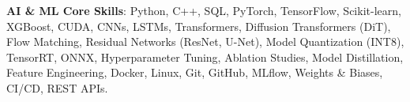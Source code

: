 \item \textbf{AI \& ML Core Skills}: Python, C++, SQL, PyTorch, TensorFlow, Scikit-learn, XGBoost, CUDA, CNNs, LSTMs, Transformers, Diffusion Transformers (DiT), Flow Matching, Residual Networks (ResNet, U-Net), Model Quantization (INT8), TensorRT, ONNX, Hyperparameter Tuning, Ablation Studies, Model Distillation, Feature Engineering, Docker, Linux, Git, GitHub, MLflow, Weights \& Biases, CI/CD, REST APIs.


